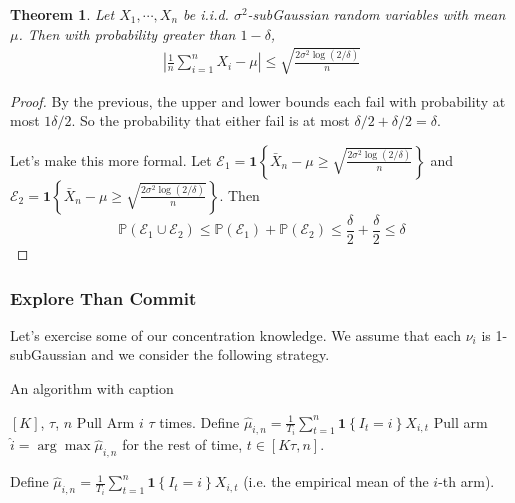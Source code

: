 \documentclass[11pt]{article}
\newtheorem{theorem}{Theorem}
\renewcommand{\P}{\mathbb{P}}
\newcommand{\1}[1]{\mathbf{1}\left\{#1\right\}}
\begin{document}
\begin{theorem}
Let $X_1, \cdots, X_n$ be i.i.d. $\sigma^2$-subGaussian random variables with mean $\mu$. Then with probability greater than $1-\delta$,
\begin{align}
\left|\frac{1}{n}\sum_{i=1}^n X_i - \mu\right| \leq \sqrt{\frac{2\sigma^2\log(2/\delta)}{n}}
\end{align}
\end{theorem}
\begin{proof}
     By the previous, the upper and lower bounds each fail with probability at most $1\delta/2$. So the probability that either fail is at most $\delta/2 + \delta/2 = \delta$.

    Let's make this more formal. Let $\mathcal{E}_1 = \1{\bar{X}_n - \mu \geq \sqrt{\frac{2\sigma^2\log(2/\delta)}{n}}}$ and $\mathcal{E}_2 = \1{\bar{X}_n - \mu \geq \sqrt{\frac{2\sigma^2\log(2/\delta)}{n}}}$. Then \[\P(\mathcal{E}_1\cup\mathcal{E}_2) \leq \P(\mathcal{E}_1) + \P(\mathcal{E}_2) \leq \frac{\delta}{2} + \frac{\delta}{2} \leq \delta\]
\end{proof}    

\subsubsection{Explore Than Commit}

Let's exercise some of our concentration knowledge. We assume that each $\nu_i$ is 1-subGaussian and we consider the following strategy.
\begin{algorithm}
\caption{An algorithm with caption}\label{alg:cap}
\begin{algorithmic}
\State $[K]$, $\tau$, $n$
    \State Pull Arm $i$ $\tau$ times. 
\EndFor
\State Define $\hat{\mu}_{i,n} = \frac{1}{T_i} \sum_{t=1}^n \1{I_t = i} X_{i,t}$
\State Pull arm $\hat{i} = \arg\max \hat{\mu}_{i,n}$ for the rest of time, $t\in [K\tau,n]$.
\end{algorithmic}
\end{algorithm}

Define $\hat{\mu}_{i,n} = \frac{1}{T_i} \sum_{t=1}^n \1{I_t = i} X_{i,t}$ (i.e. the empirical mean of the $i$-th arm). 
\end{document}

